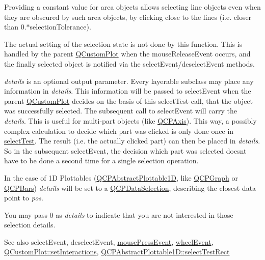 Providing a constant value for area objects allows selecting line objects even when they are obscured by such area objects, by clicking close to the lines (i.\+e. closer than 0.$\ast$selection\+Tolerance).

The actual setting of the selection state is not done by this function. This is handled by the parent \hyperlink{classQCustomPlot}{Q\+Custom\+Plot} when the mouse\+Release\+Event occurs, and the finally selected object is notified via the select\+Event/deselect\+Event methods.

{\itshape details} is an optional output parameter. Every layerable subclass may place any information in {\itshape details}. This information will be passed to select\+Event when the parent \hyperlink{classQCustomPlot}{Q\+Custom\+Plot} decides on the basis of this select\+Test call, that the object was successfully selected. The subsequent call to select\+Event will carry the {\itshape details}. This is useful for multi-\/part objects (like \hyperlink{classQCPAxis}{Q\+C\+P\+Axis}). This way, a possibly complex calculation to decide which part was clicked is only done once in \hyperlink{classQCPAxis_a63b7103c57fe9acfbce164334ea837f8}{select\+Test}. The result (i.\+e. the actually clicked part) can then be placed in {\itshape details}. So in the subsequent select\+Event, the decision which part was selected doesn\textquotesingle{}t have to be done a second time for a single selection operation.

In the case of 1D Plottables (\hyperlink{classQCPAbstractPlottable1D}{Q\+C\+P\+Abstract\+Plottable1D}, like \hyperlink{classQCPGraph}{Q\+C\+P\+Graph} or \hyperlink{classQCPBars}{Q\+C\+P\+Bars}) {\itshape details} will be set to a \hyperlink{classQCPDataSelection}{Q\+C\+P\+Data\+Selection}, describing the closest data point to {\itshape pos}.

You may pass 0 as {\itshape details} to indicate that you are not interested in those selection details.

\begin{DoxySeeAlso}{See also}
select\+Event, deselect\+Event, \hyperlink{classQCPAxis_a61bc07cda6193a3fa6b5aa198fc4e4fa}{mouse\+Press\+Event}, \hyperlink{classQCPAxis_aa850f195d7cc470c53809d0fff5e444d}{wheel\+Event}, \hyperlink{classQCustomPlot_a5ee1e2f6ae27419deca53e75907c27e5}{Q\+Custom\+Plot\+::set\+Interactions}, \hyperlink{classQCPAbstractPlottable1D_a22377bf6e57ab7eedbc9e489250c6ded}{Q\+C\+P\+Abstract\+Plottable1\+D\+::select\+Test\+Rect} 
\end{DoxySeeAlso}


